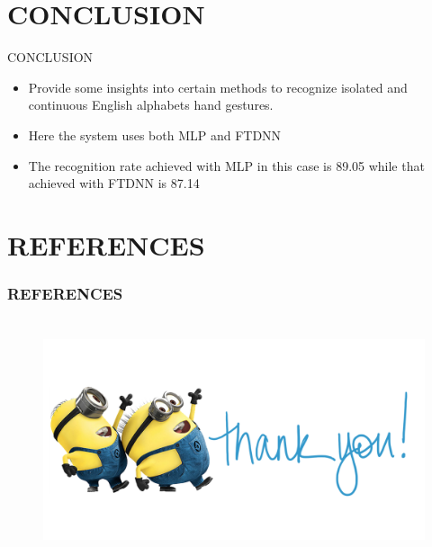 \documentclass{beamer}
\begin{document}
\section{CONCLUSION}
\begin{frame}{CONCLUSION}
\begin{itemize}
\item Provide
some insights into certain methods to recognize isolated and continuous English alphabets
hand gestures.
\linebreak
\item Here the system uses both MLP and FTDNN
\linebreak
\item The recognition
rate achieved with MLP in this case is 89.05 while that achieved with FTDNN is 87.14 
\end{itemize}
\end{frame}
\section{REFERENCES}
\begin{frame}[allowframebreaks]
\frametitle{REFERENCES}
    { }
    
\end{frame}
\section{}
\begin{frame}
\begin{figure}
\begin{center}
\includegraphics[scale=0.7]{thankyou.png}
\end{center}
\end{figure}
\end{frame}






\end{document}
